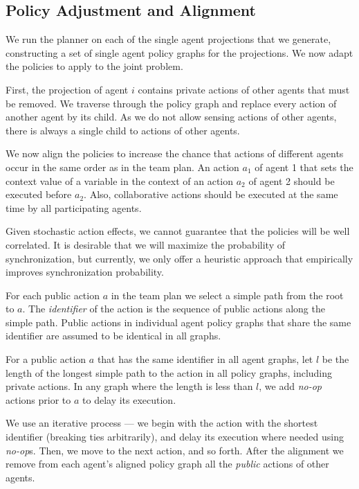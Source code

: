 \documentclass[letterpaper]{article} %
\theoremstyle{definition}
\newcommand{\eliran}[1]{\textbf{[\color{red}ELIRAN:#1]}}
\begin{document}
\subsection{Policy Adjustment and Alignment}

We run the planner on each of the single agent projections that we generate, constructing a set of single agent policy graphs for the projections. We now adapt the policies to apply to the joint problem. 

First, the projection of agent $i$ contains private actions of other agents that must be removed. We traverse through the policy graph and replace every action of another agent by its child. As we do not allow sensing actions of other agents, there is always a single child to actions of other agents.


We now align the policies to increase  the chance that actions of different agents occur in the same order as in the team plan. An action $a_1$ of agent 1 that sets the context value of a variable in the context of an action $a_2$ of agent 2 should be executed before $a_2$. Also, collaborative actions should be executed at the same time by all participating agents.  


Given stochastic action effects, we cannot guarantee that the policies will be well correlated. It is desirable that we will maximize the probability of synchronization, but currently, we only offer a heuristic approach that empirically improves synchronization probability. 

For each public action $a$ in the team plan we select a simple path from the root to $a$. The {\em identifier} of the action is the sequence of public actions along the simple path. Public actions in individual agent policy graphs that share the same identifier are assumed to be identical in all graphs.

For a public action $a$ that has the same identifier in all agent graphs, let $l$ be the length of the longest simple path to the action in all policy graphs, including private actions. In any graph where the length is less than $l$, we add {\em no-op} actions prior to $a$ to delay its execution.

We use an iterative process --- we begin with the action with the shortest identifier (breaking ties arbitrarily), and delay its execution where needed using {\em no-op}s. Then, we move to the next action, and so forth.
%
After the alignment we remove from each agent's aligned policy graph all the {\em public} actions of other agents.
\end{document}
